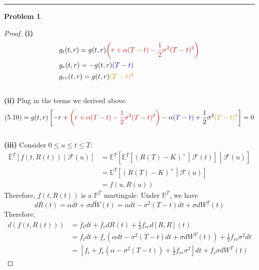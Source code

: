 \documentclass[a4paper, 10pt]{article}
\theoremstyle{definition}
\newtheorem{problem}{Problem}
\theoremstyle{hSol}
\begin{document}
\noindent\rule{16cm}{0.4pt}
\begin{problem} 
\end{problem}
\begin{proof} \textbf{(i)} 
\begin{equation}
  \begin{split}
    &g_t(t,r) = g(t,r)\textcolor{red}{\left(r+\alpha(T-t)-\frac{1}{2}\sigma^2(T-t)^2\right)}\\
    &g_r(t,r) = -g(t,r)\textcolor{blue}{\left(T-t\right)}\\
    &g_{rr}(t,r) = g(t,r)\textcolor{orange}{(T-t)^2}
  \end{split}
\end{equation}
~\\
\textbf{(ii)} Plug in the terms we derived above:
\begin{equation}
  (5.10) = g(t,r)\left[-r + \textcolor{red}{\left(r+\alpha(T-t)-\frac{1}{2}\sigma^2(T-t)^2\right)} - \alpha\textcolor{blue}{(T-t)} + \frac{1}{2}\sigma^2\textcolor{orange}{(T-t)^2}\right] = 0
\end{equation}
~\\
\textbf{(iii)} Consider $0\leq u\leq t\leq T$:
\begin{equation}
  \begin{split}
    \mathbb{E}^T\left[f(t,R(t))\middle|\mathcal{F}(u)\right] &=  \mathbb{E}^T\left[\mathbb{E}^T\left[(R(T)-K)^+\middle|\mathcal{F}(t)\right]\middle|\mathcal{F}(u)\right] \\
  &=\mathbb{E}^T\left[(R(T)-K)^+\middle|\mathcal{F}(u)\right] \\
  &= f(u, R(u))
  \end{split}
\end{equation}
Therefore, $f(t,R(t))$ is a $\mathbb{P}^T$ martingale. Under $\mathbb{P}^T$, we have 
$$
dR(t) = \alpha dt + \sigma d\tilde{W}(t) = \alpha dt  - \sigma^2(T-t)dt + \sigma dW^T(t)
$$
Therefore,
\begin{equation}
  \begin{split}
    d(f(t,R(t))) &= f_t dt + f_r dR(t) + \frac{1}{2}f_{rr} d[R,R](t) \\
    &=f_t dt + f_r(\alpha dt  - \sigma^2(T-t)dt + \sigma dW^T(t)) + \frac{1}{2}f_{rr} \sigma^2 dt\\
    &= \left[f_t + f_r(\alpha  - \sigma^2(T-t)) + \frac{1}{2}f_{rr} \sigma^2\right] dt + f_r\sigma dW^T(t)
  \end{split}
\end{equation}

\end{proof}
\end{document}
